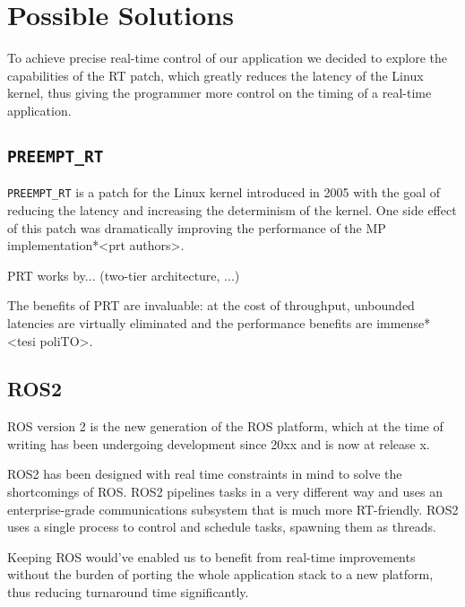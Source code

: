 \documentclass[a4paper,12pt]{report}
\begin{document}
\section{Possible Solutions}

To achieve precise real-time control of our application we decided to explore the capabilities of the RT patch, which greatly reduces the latency of the Linux kernel, thus giving the programmer more control on the timing of a real-time application.

\subsection{\texttt{PREEMPT\_RT}}

\texttt{PREEMPT\_RT} is a patch for the Linux kernel introduced in 2005 with the goal of reducing the latency and increasing the determinism of the kernel\cite{survey-preempt-rt}. One side effect of this patch was dramatically improving the performance of the MP implementation*<prt authors>.

PRT works by... (two-tier architecture, ...)

The benefits of PRT are invaluable: at the cost of throughput, unbounded latencies are virtually eliminated and the performance benefits are immense*<tesi poliTO>.

\subsection{ROS2}

ROS version 2 is the new generation of the ROS platform, which at the time of writing has been undergoing development since 20xx and is now at release x.

ROS2 has been designed with real time constraints in mind to solve the shortcomings of ROS. ROS2 pipelines tasks in a very different way and uses an enterprise-grade communications subsystem that is much more RT-friendly. ROS2 uses a single process to control and schedule tasks, spawning them as threads.

Keeping ROS would've enabled us to benefit from real-time improvements without the burden of porting the whole application stack to a new platform, thus reducing turnaround time significantly. 
\end{document}
